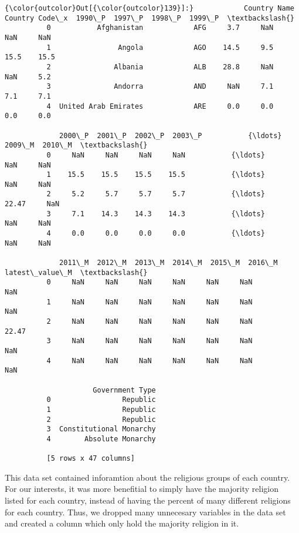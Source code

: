 \documentclass[11pt]{article}
\begin{document}
\begin{Verbatim}[commandchars=\\\{\}]
{\color{outcolor}Out[{\color{outcolor}139}]:}            Country Name Country Code\_x  1990\_P  1997\_P  1998\_P  1999\_P  \textbackslash{}
          0           Afghanistan            AFG     3.7     NaN     NaN     NaN   
          1                Angola            AGO    14.5     9.5    15.5    15.5   
          2               Albania            ALB    28.8     NaN     NaN     5.2   
          3               Andorra            AND     NaN     7.1     7.1     7.1   
          4  United Arab Emirates            ARE     0.0     0.0     0.0     0.0   
          
             2000\_P  2001\_P  2002\_P  2003\_P           {\ldots}             2009\_M  2010\_M  \textbackslash{}
          0     NaN     NaN     NaN     NaN           {\ldots}                NaN     NaN   
          1    15.5    15.5    15.5    15.5           {\ldots}                NaN     NaN   
          2     5.2     5.7     5.7     5.7           {\ldots}              22.47     NaN   
          3     7.1    14.3    14.3    14.3           {\ldots}                NaN     NaN   
          4     0.0     0.0     0.0     0.0           {\ldots}                NaN     NaN   
          
             2011\_M  2012\_M  2013\_M  2014\_M  2015\_M  2016\_M  latest\_value\_M  \textbackslash{}
          0     NaN     NaN     NaN     NaN     NaN     NaN             NaN   
          1     NaN     NaN     NaN     NaN     NaN     NaN             NaN   
          2     NaN     NaN     NaN     NaN     NaN     NaN           22.47   
          3     NaN     NaN     NaN     NaN     NaN     NaN             NaN   
          4     NaN     NaN     NaN     NaN     NaN     NaN             NaN   
          
                     Government Type  
          0                 Republic  
          1                 Republic  
          2                 Republic  
          3  Constitutional Monarchy  
          4        Absolute Monarchy  
          
          [5 rows x 47 columns]
\end{Verbatim}
            
    This data set contained inforamtion about the religious groups of each
country. For our interests, it was more benefitial to simply have the
majority religion listed for each country, instead of having the percent
of many different religions for each country. Thus, we dropped many
unnecesary variables in the data set and created a column which only
hold the majority religion in it.
\end{document}
